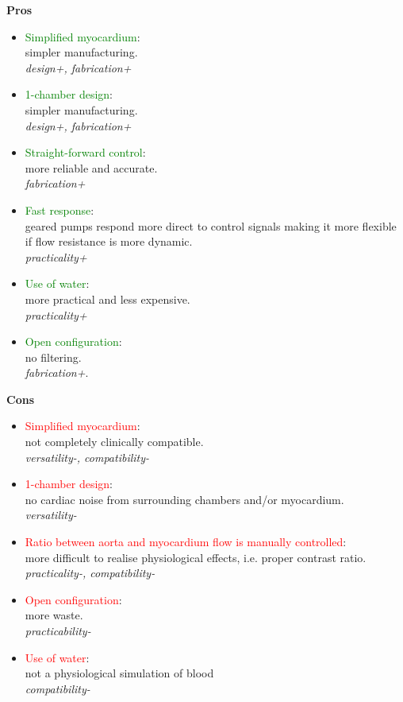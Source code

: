 \begin{minipage}[t]{0.5\textwidth}
\centering\textbf{Pros}
\begin{itemize} [noitemsep]
	\item \textcolor{green}{Simplified myocardium}: \\ simpler manufacturing. \\ \textit{design+, fabrication+}
	\item \textcolor{green}{1-chamber design}: \\ simpler manufacturing. \\ \textit{design+, fabrication+}
	\item \textcolor{green}{Straight-forward control}: \\ more reliable and accurate. \\ \textit{fabrication+}
	\item \textcolor{green}{Fast response}: \\ geared pumps respond more direct to control signals making it more flexible if flow resistance is more dynamic. \\ \textit{practicality+}
	\item \textcolor{green}{Use of water}: \\ more practical and less expensive. \\ \textit{practicality+}
	\item \textcolor{green}{Open configuration}: \\ no filtering. \\ \textit{fabrication+}.
\end{itemize}
\end{minipage}%
\begin{minipage}[t]{0.5\textwidth}
\centering\textbf{Cons}
\begin{itemize} [noitemsep]
	\item \textcolor{red}{Simplified myocardium}: \\ not completely clinically compatible. \\ \textit{versatility-, compatibility-}
	\item \textcolor{red}{1-chamber design}: \\ no cardiac noise from surrounding chambers and/or myocardium. \\ \textit{versatility-}
	\item \textcolor{red}{Ratio between aorta and myocardium flow is manually controlled}: \\ more difficult to realise physiological effects, i.e. proper contrast ratio. \\ \textit{practicality-, compatibility-}
	\item \textcolor{red}{Open configuration}: \\ more waste. \\ \textit{practicability-}
	\item \textcolor{red}{Use of water}: \\ not a physiological simulation of blood \\ \textit{compatibility-}
\end{itemize}
\end{minipage}

